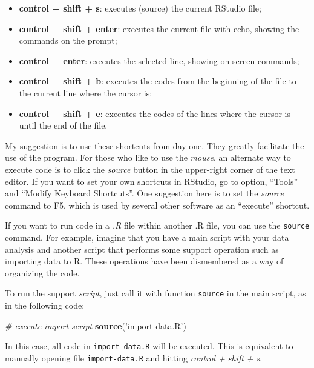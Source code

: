 \documentclass[11pt,]{book}
\newenvironment{Shaded}{\begin{snugshade}}{\end{snugshade}}
\newcommand{\KeywordTok}[1]{\textcolor[rgb]{0.27,0.27,0.27}{\textbf{#1}}}
\newcommand{\StringTok}[1]{\textcolor[rgb]{0.5,0.5,0.5}{#1}}
\newcommand{\CommentTok}[1]{\textcolor[rgb]{0.56,0.35,0.01}{\textit{#1}}}
\newcommand{\NormalTok}[1]{#1}
\providecommand{\tightlist}{%
  \setlength{\itemsep}{0pt}\setlength{\parskip}{0pt}}
\begin{document}
\begin{itemize}
\tightlist
\item
  \textbf{control + shift + s}: executes (source) the current RStudio
  file;
\item
  \textbf{control + shift + enter}: executes the current file with echo,
  showing the commands on the prompt;
\item
  \textbf{control + enter}: executes the selected line, showing
  on-screen commands;
\item
  \textbf{control + shift + b}: executes the codes from the beginning of
  the file to the current line where the cursor is;
\item
  \textbf{control + shift + e}: executes the codes of the lines where
  the cursor is until the end of the file.
\end{itemize}

My suggestion is to use these shortcuts from day one. They greatly
facilitate the use of the program. For those who like to use the
\emph{mouse}, an alternate way to execute code is to click the
\emph{source} button in the upper-right corner of the text editor. If
you want to set your own shortcuts in RStudio, go to option, ``Tools''
and ``Modify Keyboard Shortcuts''. One suggestion here is to set the
\emph{source} command to F5, which is used by several other software as
an ``execute'' shortcut.

If you want to run code in a \emph{.R} file within another .R file, you
can use the \texttt{source} command. For example, imagine that you have
a main script with your data analysis and another script that performs
some support operation such as importing data to R. These operations
have been dismembered as a way of organizing the code.

To run the support \emph{script}, just call it with function
\texttt{source} in the main script, as in the following code:

\begin{Shaded}
\begin{Highlighting}[]
\CommentTok{# execute import script}
\KeywordTok{source}\NormalTok{(}\StringTok{'import-data.R'}\NormalTok{)}
\end{Highlighting}
\end{Shaded}

In this case, all code in \texttt{import-data.R} will be executed. This
is equivalent to manually opening file \texttt{import-data.R} and
hitting \emph{control + shift + s}.
\end{document}
